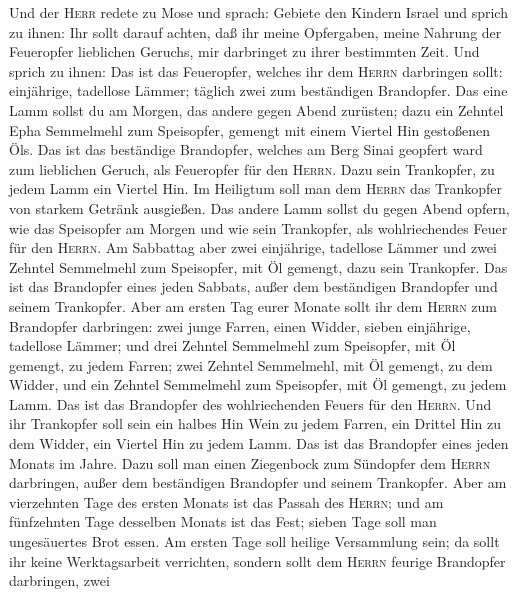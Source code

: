  Und der \textsc{Herr} redete zu Mose und sprach: Gebiete
den Kindern Israel und sprich zu ihnen:  Ihr sollt darauf
achten, daß ihr meine Opfergaben, meine Nahrung der Feueropfer
lieblichen Geruchs, mir darbringet zu ihrer bestimmten Zeit.
 Und sprich zu ihnen: Das ist das Feueropfer, welches ihr
dem \textsc{Herrn} darbringen sollt: einjährige, tadellose Lämmer;
täglich zwei zum beständigen Brandopfer.  Das eine Lamm
sollst du am Morgen, das andere gegen Abend zurüsten; 
dazu ein Zehntel Epha Semmelmehl zum Speisopfer, gemengt mit einem
Viertel Hin gestoßenen Öls.  Das ist das beständige
Brandopfer, welches am Berg Sinai geopfert ward zum lieblichen Geruch,
als Feueropfer für den \textsc{Herrn}.  Dazu sein
Trankopfer, zu jedem Lamm ein Viertel Hin. Im Heiligtum soll man dem
\textsc{Herrn} das Trankopfer von starkem Getränk ausgießen.
 Das andere Lamm sollst du gegen Abend opfern, wie das
Speisopfer am Morgen und wie sein Trankopfer, als wohlriechendes Feuer
für den \textsc{Herrn}.  Am Sabbattag aber zwei
einjährige, tadellose Lämmer und zwei Zehntel Semmelmehl zum Speisopfer,
mit Öl gemengt, dazu sein Trankopfer.  Das ist das
Brandopfer eines jeden Sabbats, außer dem beständigen Brandopfer und
seinem Trankopfer.  Aber am ersten Tag eurer Monate sollt
ihr dem \textsc{Herrn} zum Brandopfer darbringen: zwei junge Farren,
einen Widder, sieben einjährige, tadellose Lämmer;  und
drei Zehntel Semmelmehl zum Speisopfer, mit Öl gemengt, zu jedem Farren;
zwei Zehntel Semmelmehl, mit Öl gemengt, zu dem Widder, 
und ein Zehntel Semmelmehl zum Speisopfer, mit Öl gemengt, zu jedem
Lamm. Das ist das Brandopfer des wohlriechenden Feuers für den
\textsc{Herrn}.  Und ihr Trankopfer soll sein ein halbes
Hin Wein zu jedem Farren, ein Drittel Hin zu dem Widder, ein Viertel Hin
zu jedem Lamm. Das ist das Brandopfer eines jeden Monats im Jahre.
 Dazu soll man einen Ziegenbock zum Sündopfer dem
\textsc{Herrn} darbringen, außer dem beständigen Brandopfer und seinem
Trankopfer.  Aber am vierzehnten Tage des ersten Monats
ist das Passah des \textsc{Herrn};  und am fünfzehnten
Tage desselben Monats ist das Fest; sieben Tage soll man ungesäuertes
Brot essen.  Am ersten Tage soll heilige Versammlung
sein; da sollt ihr keine Werktagsarbeit verrichten, 
sondern sollt dem \textsc{Herrn} feurige Brandopfer darbringen, zwei
